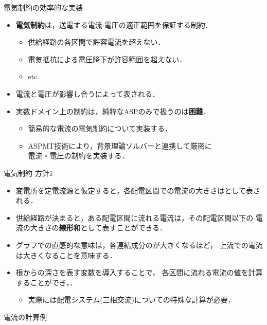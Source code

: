 \begin{frame}{電気制約の効率的な実装}
 \begin{itemize}
  \item \alert{\bf 電気制約}は，送電する電流$\cdot$電圧の適正範囲を保証する制約．
  \begin{itemize}
   \item 供給経路の各区間で許容電流を超えない．
   \item 電気抵抗による電圧降下が許容範囲を超えない．
   \item etc.
  \end{itemize}
  \item 電流と電圧が影響し合うによって表される．
  \item 実数ドメイン上の制約は，純粋なASPのみで扱うのは\alert{\bf 困難}．
		\begin{itemize}
		 \item {} 簡易的な電流の電気制約について実装する．
		 \item {} ASPMT技術により，背景理論ソルバーと連携して厳密に\\
               \hspace{4zw}\!電流・電圧の制約を実装する．
		\end{itemize}
 \end{itemize}
\end{frame}
\begin{frame}{電気制約 方針1}
 \begin{itemize}
  \item 変電所を定電流源と仮定すると，各配電区間での電流の大きさはとして表される．
  \item 供給経路が決まると，ある配電区間に流れる電流は，その配電区間以下の
		電流の大きさの\alert{\bf 線形和}として表すことができる．
  \item グラフでの直感的な意味は，各連結成分のが大きくなるほど，
		上流での電流は大きくなることを意味する．
  \item 根からの深さを表す変数を導入することで，
		各区間に流れる電流の値を計算することができ，．
		\begin{itemize}
		 \item 実際には配電システム(三相交流)についての特殊な計算が必要．
		\end{itemize}
 \end{itemize}\vfill
 \begin{exampleblock}{電流の計算例}
  \centering
  
 \end{exampleblock} \vfill
\end{frame}
